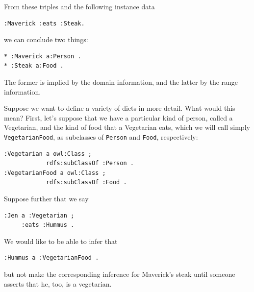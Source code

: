 From these triples and the following instance data

\begin{lstlisting}
:Maverick :eats :Steak.
\end{lstlisting}

we can conclude two things:

\begin{lstlisting}
* :Maverick a:Person .
* :Steak a:Food .
\end{lstlisting}

The former is implied by the domain information, and the latter by the
range information.

Suppose we want to define a variety of diets in more detail. What would
this mean? First, let's suppose that we have a particular kind of
person, called a Vegetarian, and the kind of food that a Vegetarian
eats, which we will call simply \texttt{VegetarianFood}, as subclasses of \texttt{Person}
and \texttt{Food}, respectively:

\begin{lstlisting}
:Vegetarian a owl:Class ;
            rdfs:subClassOf :Person .
:VegetarianFood a owl:Class ;
            rdfs:subClassOf :Food .
\end{lstlisting}

Suppose further that we say

\begin{lstlisting}
:Jen a :Vegetarian ;
     :eats :Hummus .
\end{lstlisting}

We would like to be able to infer that

\begin{lstlisting}
:Hummus a :VegetarianFood .
\end{lstlisting}

but not make the corresponding inference for Maverick's steak until
someone asserts that he, too, is a vegetarian.

